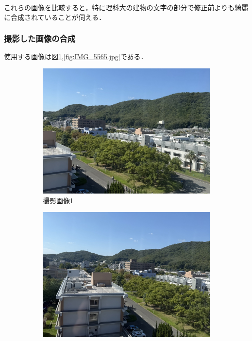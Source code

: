 \documentclass[autodetect-engine,dvi=dvipdfmx,ja=standard,
               a4j,11pt]{bxjsarticle}
\begin{document}
これらの画像を比較すると，特に理科大の建物の文字の部分で修正前よりも綺麗に合成されていることが伺える．


\subsubsection{撮影した画像の合成}
使用する画像は図\ref{fig:IMG_5564.jpg},\ref{fig:IMG_5565.jpg}である．
\begin{figure}[h]
  \centering
  \begin{subfigure}[b]{0.3\textwidth}
    \centering
    \includegraphics[width=\textwidth]{IMG_5564.jpg}
    \caption{撮影画像1}
    \label{fig:IMG_5564.jpg}
  \end{subfigure}
  \hfill
  \begin{subfigure}[b]{0.3\textwidth}
    \centering
    \includegraphics[width=\textwidth]{IMG_5565.jpg}

\end{subfigure}
\end{figure}
\end{document}
